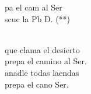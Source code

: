 \begin{cancion}%
	\begin{chorus}%
	pa el cam al Ser\\
	scuc la Pb  D. (**)\\
	\end{chorus}%
	\jump\\
	 que clama el desierto\\
	prepa el camino al Ser.\\
	anadle todas laendas\\
	prepa el cano  Ser.\\
\end{cancion}%
